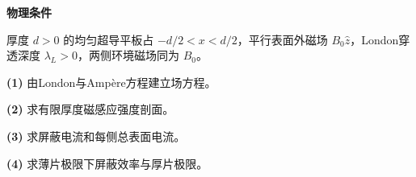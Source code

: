 \textbf{物理条件}\par 厚度 \(d>0\) 的均匀超导平板占 \(-d/2<x<d/2\)，平行表面外磁场 \(B_0\hat z\)，London穿透深度 \(\lambda_L>0\)，两侧环境磁场同为 \(B_0\)。
\par\noindent\textbf{(1)} 由London与Ampère方程建立场方程。
\par\noindent\textbf{(2)} 求有限厚度磁感应强度剖面。
\par\noindent\textbf{(3)} 求屏蔽电流和每侧总表面电流。
\par\noindent\textbf{(4)} 求薄片极限下屏蔽效率与厚片极限。
